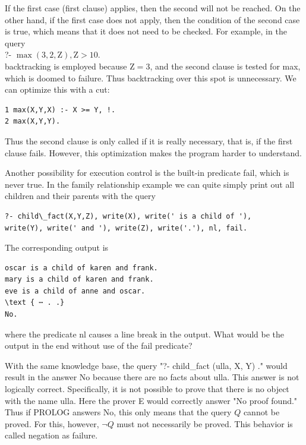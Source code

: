 \documentclass[10pt]{book}
\begin{document}
If the first case (first clause) applies, then the second will not be reached. On the other hand, if the first case does not apply, then the condition of the second case is true, which means that it does not need to be checked. For example, in the query\\
?- $\max (3,2, \mathrm{Z}), \mathrm{Z}>10$.\\
backtracking is employed because $\mathrm{Z}=3$, and the second clause is tested for max, which is doomed to failure. Thus backtracking over this spot is unnecessary. We can optimize this with a cut:


\begin{verbatim}
1 max(X,Y,X) :- X >= Y, !.
2 max(X,Y,Y).
\end{verbatim}

Thus the second clause is only called if it is really necessary, that is, if the first clause fails. However, this optimization makes the program harder to understand.

Another possibility for execution control is the built-in predicate fail, which is never true. In the family relationship example we can quite simply print out all children and their parents with the query

\begin{verbatim}
?- child\_fact(X,Y,Z), write(X), write(' is a child of '),
write(Y), write(' and '), write(Z), write('.'), nl, fail.
\end{verbatim}

The corresponding output is

\begin{verbatim}
oscar is a child of karen and frank.
mary is a child of karen and frank.
eve is a child of anne and oscar.
\text { ⋯ . .}
No.
\end{verbatim}

where the predicate nl causes a line break in the output. What would be the output in the end without use of the fail predicate?

With the same knowledge base, the query "?- child\_fact (ulla, X, Y) ." would result in the answer No because there are no facts about ulla. This answer is not logically correct. Specifically, it is not possible to prove that there is no object with the name ulla. Here the prover E would correctly answer "No proof found." Thus if PROLOG answers No, this only means that the query $Q$ cannot be proved. For this, however, $\neg Q$ must not necessarily be proved. This behavior is called negation as failure.
\end{document}
